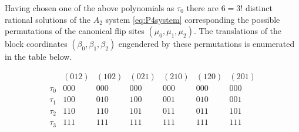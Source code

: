 \documentclass{amsart}
\theoremstyle{definition}
\begin{document}
Having chosen one of the above polynomials as $\tau_0$ there are
$6=3!$ distinct rational solutions of the $A_2$ system
\eqref{eq:P4system} corresponding the possible permutations of the
canonical flip sites $(\mu_0,\mu_1,\mu_2)$.  The translations of the
block coordinates $(\beta_0,\beta_1,\beta_2)$ engendered by these
permutations is enumerated in the table below.

\[
  \begin{array}{ccccccc}
    & (012) & (102) & (021) & (210) & (120) & (201) \\
    \tau_0&000&000&000&000&000&000\\
    \tau_1&100&010&100&001&010&001\\
    \tau_2&110&110&101&011&011&101\\
    \tau_3& 111& 111& 111& 111& 111& 111\\
  \end{array}
\]

\end{document}
